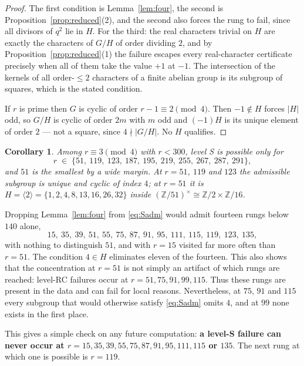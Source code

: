\documentclass[11pt]{article}
\newtheorem{corollary}[theorem]{Corollary}
\theoremstyle{definition}
\theoremstyle{remark}
\begin{document}
\begin{proof}
The first condition is Lemma~\ref{lem:four}, the second is
Proposition~\ref{prop:reduced}(2), and the second also forces the rung to fail, since all
divisors of $q^2$ lie in $H$. For the third: the real characters trivial on $H$ are
exactly the characters of $G/H$ of order dividing $2$, and by
Proposition~\ref{prop:reduced}(1) the failure escapes every real-character certificate
precisely when all of them take the value $+1$ at $-1$. The intersection of the kernels of
all order-$\le 2$ characters of a finite abelian group is its subgroup of squares, which
is the stated condition.

If $r$ is prime then $G$ is cyclic of order $r - 1 \equiv 2 \pmod 4$. Then $-1 \notin H$
forces $|H|$ odd, so $G/H$ is cyclic of order $2m$ with $m$ odd and $(-1)H$ is its unique
element of order $2$ --- not a square, since $4 \nmid |G/H|$. No $H$ qualifies.
\end{proof}

\begin{corollary}\label{cor:Srungs}
Among $r \equiv 3 \pmod 4$ with $r < 300$, level S is possible only for
\[
r \;\in\; \{51,\ 119,\ 123,\ 187,\ 195,\ 219,\ 255,\ 267,\ 287,\ 291\},
\]
and $51$ is the smallest by a wide margin. At $r = 51$, $119$ and $123$ the admissible
subgroup is unique and cyclic of index $4$; at $r = 51$ it is
$H = \langle 2 \rangle = \{1,2,4,8,13,16,26,32\}$ inside
$(\mathbb{Z}/51)^\times \cong \mathbb{Z}/2 \times \mathbb{Z}/16$.
\end{corollary}

Dropping Lemma~\ref{lem:four} from \eqref{eq:Sadm} would admit fourteen rungs below $140$
alone,
\[
15,\ 35,\ 39,\ 51,\ 55,\ 75,\ 87,\ 91,\ 95,\ 111,\ 115,\ 119,\ 123,\ 135,
\]
with nothing to distinguish $51$, and with $r = 15$ visited far more often than
$r = 51$. The condition $4\in H$ eliminates eleven of the fourteen. This also shows
that the concentration at $r=51$ is not simply an artifact of which rungs are reached:
level-RC failures occur at $r = 51, 75, 91, 99, 115$. Thus these rungs are present in
the data and can fail for local reasons. Nevertheless, at $75$, $91$ and $115$ every
subgroup that would otherwise satisfy \eqref{eq:Sadm}
omits $4$, and at $99$ none exists in the first place.

This gives a simple check on any future computation:
\textbf{a level-S failure can never occur at
$r = 15, 35, 39, 55, 75, 87, 91, 95, 111, 115$ or $135$}. The next rung at which one
is possible is $r=119$.
\end{document}
